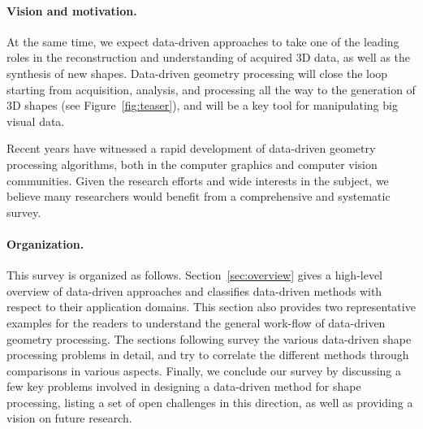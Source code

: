 \paragraph*{Vision and motivation.}
%
At the same time, we expect data-driven approaches to take one of the leading roles in the reconstruction and understanding of acquired 3D data, as well as the synthesis of new shapes.
Data-driven geometry processing will close the loop starting from acquisition, analysis, and processing all the way to the generation of 3D shapes (see Figure~\ref{fig:teaser}), and will be a key tool for manipulating big visual data.

Recent years have witnessed a rapid development of data-driven geometry processing algorithms, both in the computer graphics and computer vision communities. Given the research efforts and wide interests in the subject, we believe many researchers would benefit from a comprehensive and systematic survey.  

\paragraph*{Organization.}
This survey is organized as follows. Section~\ref{sec:overview} gives a high-level overview of data-driven approaches and classifies data-driven methods with respect to their application domains. This section also provides two representative examples for the readers to understand the general work-flow of data-driven geometry processing. The sections following survey the various data-driven shape processing problems in detail, and try to correlate the different methods through comparisons in various aspects. Finally, we conclude our survey by discussing a few key problems involved in designing a data-driven
method for shape processing, listing a set of open challenges in this direction, as well as providing a vision on future research.

